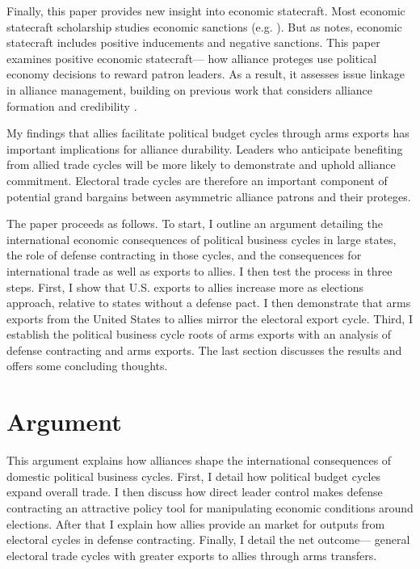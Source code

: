 \documentclass[12pt]{article}
\begin{document}
Finally, this paper provides new insight into economic statecraft. 
Most economic statecraft scholarship studies economic sanctions (e.g. \citep{Marinov2005, Allen2008, Escriba-FolchWright2010}).
But as \citet{Baldwin2020} notes, economic statecraft includes positive inducements and negative sanctions. 
This paper examines positive economic statecraft--- how alliance proteges use political economy decisions to reward patron leaders.
As a result, it assesses issue linkage in alliance management, building on previous work that considers alliance formation \citep{Poast2012} and credibility \citep{Davis2008, Poast2013}. 


My findings that allies facilitate political budget cycles through arms exports has important implications for alliance durability. 
Leaders who anticipate benefiting from allied trade cycles will be more likely to demonstrate and uphold alliance commitment. 
Electoral trade cycles are therefore an important component of potential grand bargains between asymmetric alliance patrons and their proteges. 


The paper proceeds as follows. 
To start, I outline an argument detailing the international economic consequences of political business cycles in large states, the role of defense contracting in those cycles, and the consequences for international trade as well as exports to allies.
I then test the process in three steps. 
First, I show that U.S. exports to allies increase more as elections approach, relative to states without a defense pact. 
I then demonstrate that arms exports from the United States to allies mirror the electoral export cycle.
Third, I establish the political business cycle roots of arms exports with an analysis of defense contracting and arms exports.
The last section discusses the results and offers some concluding thoughts.


\section{Argument}


This argument explains how alliances shape the international consequences of domestic political business cycles. 
First, I detail how political budget cycles expand overall trade.
I then discuss how direct leader control makes defense contracting an attractive policy tool for manipulating economic conditions around elections. 
After that I explain how allies provide an market for outputs from electoral cycles in defense contracting. 
Finally, I detail the net outcome--- general electoral trade cycles with greater exports to allies through arms transfers. 
\end{document}
